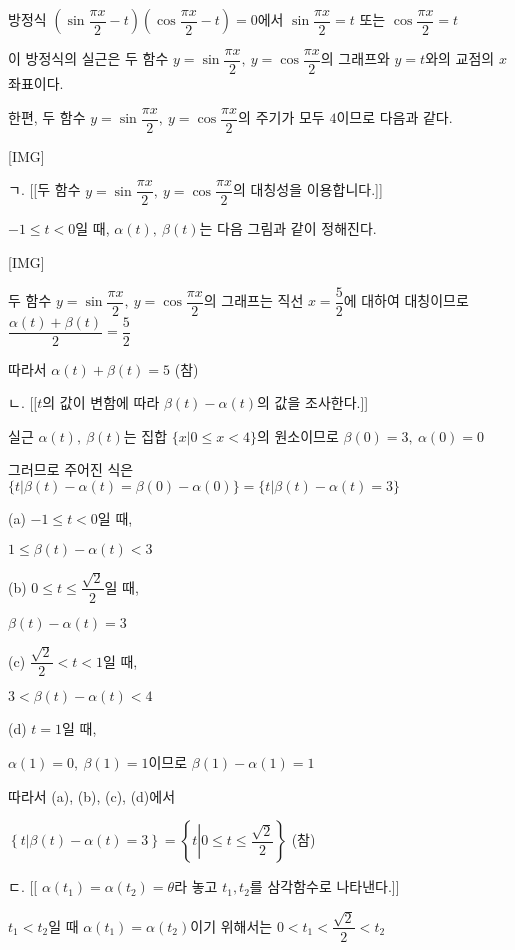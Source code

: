 \documentclass{oblivoir}
\begin{document}
방정식 $\left(\sin\dfrac{\pi x}{2}-t\right)\left(\cos\dfrac{\pi x}{2}-t\right)=0$에서
$\sin\dfrac{\pi x}{2}=t$ 또는 $\cos\dfrac{\pi x}{2}=t$

이 방정식의 실근은 두 함수 $y=\sin\dfrac{\pi x}{2},\:y=\cos\dfrac{\pi x}{2}$의 그래프와 $y=t$와의 교점의 $x$좌표이다.

한편, 두 함수 $y=\sin\dfrac{\pi x}{2},\:y=\cos\dfrac{\pi x}{2}$의 주기가 모두 $4$이므로 다음과 같다.

[IMG]

ㄱ. [[두 함수 $y=\sin\dfrac{\pi x}{2},\:y=\cos\dfrac{\pi x}{2}$의 대칭성을 이용합니다.]]

$-1\le t< 0$일 때, $\alpha(t),\:\beta(t)$는 다음 그림과 같이 정해진다.

[IMG]

두 함수 $y=\sin\dfrac{\pi x}{2},\:y=\cos\dfrac{\pi x}{2}$의 그래프는 직선 $x=\dfrac{5}{2}$에 대하여 대칭이므로 $\dfrac{\alpha(t)+\beta(t)}{2}=\dfrac{5}{2}$

따라서 $\alpha(t)+\beta(t)=5$ (참)

ㄴ. [[$t$의 값이 변함에 따라 $\beta(t)-\alpha(t)$의 값을 조사한다.]]

실근 $\alpha(t),\:\beta(t)$는 집합 $\{x\vert  0\le x< 4\}$의 원소이므로 $\beta(0)=3,\:\alpha(0)=0$

그러므로 주어진 식은 $\{t\vert \beta(t)-\alpha(t)=\beta(0)-\alpha(0)\}=\{t\vert \beta(t)-\alpha(t)=3\}$

(a) $-1\le t< 0$일 때,

$1 \leq \beta(t)-\alpha(t)< 3$

(b) $0\le t\le\dfrac{\sqrt{2}}{2}$일 때,

$\beta(t)-\alpha(t)=3$

(c) $\dfrac{\sqrt{2}}{2}< t< 1$일 때,

$3< \beta(t)-\alpha(t) <4 $

(d) $t=1$일 때,

$\alpha(1)=0,\:\beta(1)=1$이므로 $\beta(1)-\alpha(1)=1$

따라서 (a), (b), (c), (d)에서

$\left\{t \left| \beta(t)-\alpha(t)=3 \right.\right\}=\left\{t \left| 0\le t\le\dfrac{\sqrt{2}}{2} \right.\right\}$ (참)

ㄷ. [[ $\alpha\left(t_{1}\right)=\alpha\left(t_{2}\right)=\theta$라 놓고 $t_{1}, t_{2}$를 삼각함수로 나타낸다.]]

$t_{1} < t_{2}$일 때 $\alpha\left(t_{1}\right)=\alpha\left(t_{2}\right)$이기 위해서는 $0< t_{1}< \dfrac{\sqrt{2}}{2}< t_{2}$
\end{document}
